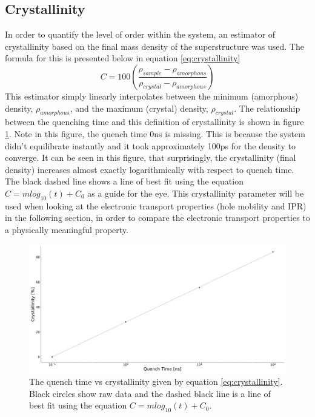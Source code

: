 \subsection{Crystallinity}
In order to quantify the level of order within the system, an estimator of crystallinity based on the final mass density of the superstructure was used. The formula for this is presented below in equation \eqref{eq:crystallinity}
\begin{equation}
  C = 100 \left(\frac{\rho_{sample} - \rho_{amorphous}}{\rho_{crystal} - \rho_{amorphous}}\right)
  \label{eq:crystallinity}
\end{equation}
This estimator simply linearly interpolates between the minimum (amorphous) density, $\rho_{amorphous}$, and the maximum (crystal) density, $\rho_{crystal}$. The relationship between the quenching time and this definition of crystallinity is shown in figure \ref{fig:crystallinity}. Note in this figure, the quench time 0ns is missing. This is because the system didn't equilibrate instantly and it took approximately 100ps for the density to converge. It can be seen in this figure, that surprisingly, the crystallinity (final density) increases almost exactly logarithmically with respect to quench time. The black dashed line shows a line of best fit using the equation $C = m log_{10}(t) + C_{0}$ as a guide for the eye. This crystallinity parameter will be used when looking at the electronic transport properties (hole mobility and IPR) in the following section, in order to compare the electronic transport properties to a physically meaningful property.
\begin{figure}[htp]
  \includegraphics[width=\textwidth]{./img/DifferentQuenchTimes/QuenchTvsCrystallinity.png}
  \caption{\label{fig:crystallinity}The quench time vs crystallinity given by equation \ref{eq:crystallinity}. Black circles show raw data and the dashed black line is a line of best fit using the equation $C = m log_{10}(t) + C_{0}$.}
\end{figure}

